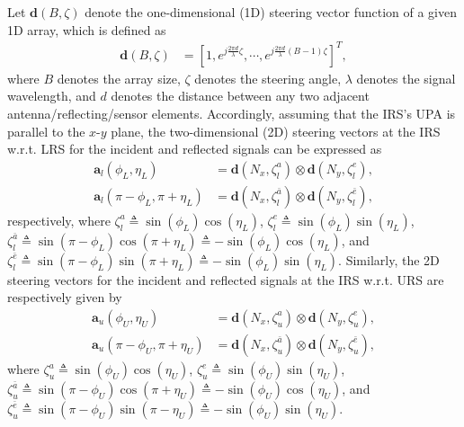 \documentclass[10pt,final,doublecolumn]{IEEEtran}
\begin{document}
Let $\mathbf{d}(B,\zeta)$ denote the one-dimensional (1D) steering vector function of a given 1D array, which is defined as
\begin{align}\label{anz}
\mathbf{d}(B,\zeta)&=\left[1,e^{j\frac{2\pi {d}}{\lambda}\zeta},\cdots,e^{j\frac{2\pi {d}}{\lambda}(B-1)\zeta}\right]^T,
\end{align}
where $B$ denotes the array size, $\zeta$ denotes the steering
angle, $\lambda$ denotes the signal wavelength, and ${d}$ denotes the
distance between any two adjacent antenna/reflecting/sensor elements. Accordingly, assuming that the IRS's UPA is parallel to the $x$-$y$ plane, the two-dimensional (2D) steering vectors at the IRS w.r.t. LRS for the incident and reflected signals can be expressed as
\begin{align}\label{abb1}
\mathbf{a}_{{l}}({\phi}_{{L}},{\eta}_{{L}})&=\mathbf{d}(N_x,\zeta_l^a)\otimes \mathbf{d}(N_y,\zeta_l^e),\\
\mathbf{a}_{{l}}(\pi-{\phi}_{{L}},\pi+{\eta}_{{L}})&=\mathbf{d}(N_x,\zeta_l^{\bar{a}})\otimes \mathbf{d}(N_y,\zeta_l^{\bar{e}}),
\end{align}
respectively, where $\zeta_l^a\triangleq \sin({\phi}_{{L}})\cos({\eta}_{{L}})$,
$\zeta_l^e\triangleq \sin({\phi}_{{L}})\sin({\eta}_{{L}})$, $\zeta_l^{\bar{a}}\triangleq \sin(\pi-{\phi}_{{L}})\cos(\pi+{\eta}_{{L}})\triangleq -\sin({\phi}_{{L}})\cos({\eta}_{{L}})$,
and $\zeta_l^{\bar{e}}\triangleq \sin(\pi-{\phi}_{{L}})\sin(\pi+{\eta}_{{L}})\triangleq -\sin({\phi}_{{L}})\sin({\eta}_{{L}})$.
Similarly, the 2D steering vectors for the incident and reflected signals at the IRS w.r.t. URS are respectively given by
\begin{align}\label{abbb1}
\mathbf{a}_{{u}}({\phi}_{{U}},{\eta}_{{U}})&=\mathbf{d}(N_x,\zeta_u^a)\otimes \mathbf{d}(N_y,\zeta_u^e),\\
\mathbf{a}_{{u}}(\pi-{\phi}_{{U}},\pi+{\eta}_{{U}})&=\mathbf{d}(N_x,\zeta_u^{\bar{a}})\otimes \mathbf{d}(N_y,\zeta_u^{\bar{e}}),
\end{align}
where $\zeta_u^{a}\triangleq \sin({\phi}_{{U}})\cos({\eta}_{{U}})$,
$\zeta_u^{e}\triangleq \sin({\phi}_{{U}})\sin({\eta}_{{U}})$,
$\zeta_u^{\bar{a}}\triangleq \sin(\pi-{\phi}_{{U}})\cos(\pi+{\eta}_{{U}})\triangleq -\sin({\phi}_{{U}})\cos({\eta}_{{U}})$, and $\zeta_u^{\bar{e}}\triangleq \sin(\pi-{\phi}_{{U}})\sin(\pi-{\eta}_{{U}})\triangleq -\sin({\phi}_{{U}})\sin({\eta}_{{U}})$.
\end{document}
